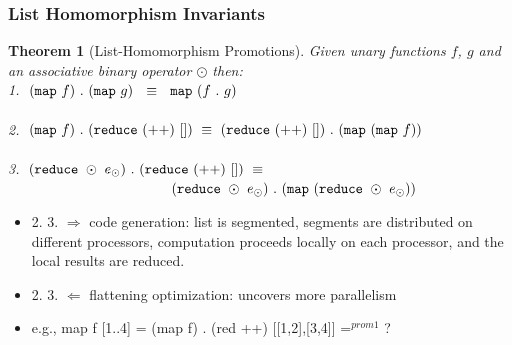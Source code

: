 \documentclass{beamer}
\newcommand{\red}[1]{\textcolor{Red}{{#1}}}
\renewcommand{\emph}[1]{\textcolor{structure}{#1}}
\newcommand{\emp}[1]{\textcolor{DikuRed}{ #1}}
\newtheorem{mytheo}{Theorem}
\begin{document}
\begin{frame}[fragile,t]
  \frametitle{List Homomorphism Invariants}

\begin{mytheo}[List-Homomorphism Promotions]\label{LHomInv}
Given unary functions $f$, $g$ and an associative binary operator $\odot$ then:\\
\emp{1.}$\ \ ({\tt map} \ f) \ . \ ({\tt map} \ g) \ \ \equiv \ \ {\tt map} \ (f \ . \ g)$\\
$\mbox{ }$ \\
\emp{2.}$\ \ ({\tt map} \ f) \ . \ ({\tt reduce} \ ({\tt ++}) \ []) \ \equiv \ ({\tt reduce} \ ({\tt ++}) \ []) \ . \ ({\tt map} \ ({\tt map} \ f) )$ \\
$\mbox{ }$ \\
\emp{3.}$\ \ ({\tt reduce} \ \odot \ e_{\odot}) \ . \ ({\tt reduce} \ (++) \ []) \ \equiv$\\
$ \ \ \ \ \ \ \ \ \ \ \ \ \ \ \ \ \ \ \ \ \ \ \ \ \ \ \ \ \ \ \ \ \ \ \
({\tt reduce} \ \odot \ e_{\odot}) \ . \ ({\tt map} \ ({\tt reduce} \ \odot \ e_{\odot}) )$
\end{mytheo}

%  

\begin{itemize}
    \item \emp{2. 3. $\Rightarrow$ code generation:} list is segmented, 
            segments are distributed on different processors, 
            computation proceeds locally on each processor, 
            and the local results are reduced. 
    \item \emph{2. 3. $\Leftarrow$ flattening optimization}: 
            uncovers more parallelism
    \item e.g., map f [1..4] = (map f) . (red ++) [[1,2],[3,4]] =$^{prom1}$ \alert{?}           
\end{itemize}

\end{frame}
\end{document}
